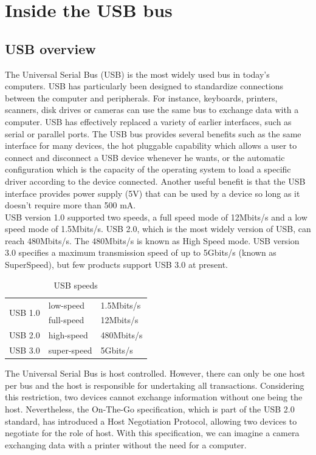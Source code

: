 \documentclass[pdftex,10pt,a4paper]{report}
\begin{document}
\section{Inside the USB bus}
\subsection{USB overview}
The Universal Serial Bus (USB) is the most widely used bus in today's computers. USB has particularly been designed to standardize connections between the computer and peripherals. For instance, keyboards, printers, scanners, disk drives or cameras can use the same bus to exchange data with a computer. USB has effectively replaced a variety of earlier interfaces, such as serial or parallel ports. The USB bus provides several benefits such as the same interface for many devices, the hot pluggable capability which allows a user to connect and disconnect a USB device whenever he wants, or the automatic configuration which is the capacity of the operating system to load a specific driver according to the device connected. Another useful benefit is that the USB interface provides power supply (5V) that can be used by a device so long as it doesn't require more than 500 mA.\\

USB version 1.0 supported two speeds, a full speed mode of 12Mbits/s and a low speed mode of 1.5Mbits/s. USB 2.0, which is the most widely version of USB, can reach 480Mbits/s. The 480Mbits/s is known as High Speed mode. USB version 3.0 specifies a maximum transmission speed of up to 5Gbits/s (known as SuperSpeed), but few products support USB 3.0 at present.
\\
\begin{table}[h!]
\begin{center}
\begin{tabular}{|l|l|l|}
\hline
\multirow{2}{*}{USB 1.0} & low-speed & 1.5Mbits/s \\
 & full-speed & 12Mbits/s \\ \hline
USB 2.0 & high-speed & 480Mbits/s \\ \hline
USB 3.0 & super-speed & 5Gbits/s \\ \hline
\end{tabular}
\end{center}
\caption{USB speeds}
\label{USB speeds}
\end{table}

The Universal Serial Bus is host controlled. However, there can only be one host per bus and the host is responsible for undertaking all transactions. Considering this restriction, two devices cannot exchange information without one being the host. Nevertheless, the On-The-Go specification, which is part of the USB 2.0 standard, has introduced a Host Negotiation Protocol, allowing two devices to negotiate for the role of host. With this specification, we can imagine a camera exchanging data with a printer without the need for a computer. 
\end{document}
